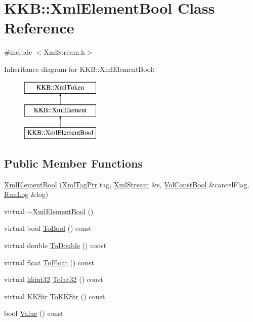 \hypertarget{class_k_k_b_1_1_xml_element_bool}{}\section{K\+KB\+:\+:Xml\+Element\+Bool Class Reference}
\label{class_k_k_b_1_1_xml_element_bool}


{\ttfamily \#include $<$Xml\+Stream.\+h$>$}

Inheritance diagram for K\+KB\+:\+:Xml\+Element\+Bool\+:\begin{figure}[H]
\begin{center}
\leavevmode
\includegraphics[height=3.000000cm]{class_k_k_b_1_1_xml_element_bool}
\end{center}
\end{figure}
\subsection*{Public Member Functions}
\begin{DoxyCompactItemize}
\item 
\hyperlink{class_k_k_b_1_1_xml_element_bool_a6424413b79c0a3ec491f49b4bc91a8cb}{Xml\+Element\+Bool} (\hyperlink{namespace_k_k_b_a9253a3ea8a5da18ca82be4ca2b390ef0}{Xml\+Tag\+Ptr} tag, \hyperlink{class_k_k_b_1_1_xml_stream}{Xml\+Stream} \&s, \hyperlink{namespace_k_k_b_a7d390f568e2831fb76b86b56c87bf92f}{Vol\+Const\+Bool} \&cancel\+Flag, \hyperlink{class_k_k_b_1_1_run_log}{Run\+Log} \&log)
\item 
virtual \hyperlink{class_k_k_b_1_1_xml_element_bool_a5c825f023363754bf2f9532a0503b035}{$\sim$\+Xml\+Element\+Bool} ()
\item 
virtual bool \hyperlink{class_k_k_b_1_1_xml_element_bool_aed830aad8c70976bddefe7373790cf4a}{To\+Bool} () const 
\item 
virtual double \hyperlink{class_k_k_b_1_1_xml_element_bool_a116bd645557defaae5d69450015124eb}{To\+Double} () const 
\item 
virtual float \hyperlink{class_k_k_b_1_1_xml_element_bool_a87badc80558f62710ffde957298c1536}{To\+Float} () const 
\item 
virtual \hyperlink{namespace_k_k_b_a8fa4952cc84fda1de4bec1fbdd8d5b1b}{kkint32} \hyperlink{class_k_k_b_1_1_xml_element_bool_a7d877d4924d9f62f1f5dc68b5a3d2663}{To\+Int32} () const 
\item 
virtual \hyperlink{class_k_k_b_1_1_k_k_str}{K\+K\+Str} \hyperlink{class_k_k_b_1_1_xml_element_bool_a66cbfc5eff140075cf6226123db0bd85}{To\+K\+K\+Str} () const 
\item 
bool \hyperlink{class_k_k_b_1_1_xml_element_bool_a8d4ec6615a74cca30a79d288d08cccd0}{Value} () const 
\end{DoxyCompactItemize}
